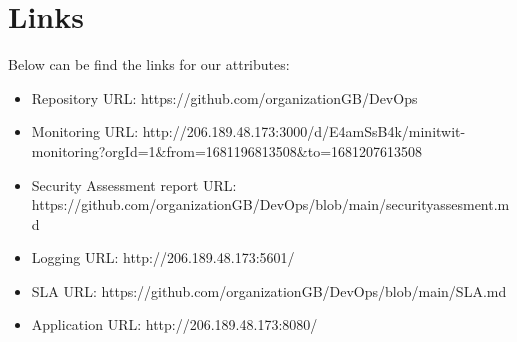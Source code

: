 \section{Links}
Below can be find the links for our attributes:
\begin{itemize}
    \item Repository URL: https://github.com/organizationGB/DevOps 
    \item Monitoring URL: http://206.189.48.173:3000/d/E4amSsB4k/minitwit-monitoring?orgId=1&from=1681196813508&to=1681207613508 
    \item Security Assessment report URL: https://github.com/organizationGB/DevOps/blob/main/securityassesment.md
    \item Logging URL: http://206.189.48.173:5601/
    \item SLA URL: https://github.com/organizationGB/DevOps/blob/main/SLA.md
    \item Application URL: http://206.189.48.173:8080/
\end{itemize}